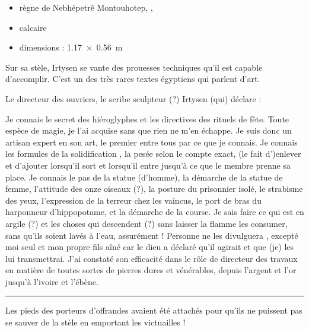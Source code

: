 \documentclass[dvipsnames,a4paper,twoside,10pt,openany,article]{memoir}
\newcommand{\separation}{%
  {\noi\hspace*{\fill}\rule{.33\textwidth}{1pt}\hspace*{\fill}}%
}
\begin{document}
\begin{itemize}
  \item règne de Nebhépetrê Montouhotep, 
        , 
  \item calcaire
  \item dimensions : \SI{1.17x0.56}{\m}
\end{itemize}

Sur sa stèle, Irtysen se vante des prouesses techniques qu'il est 
capable d'accomplir. C'est un des très rares textes égyptiens qui 
parlent d'art.

\begin{encadre}[font=\em, frametitle={Traduction partielle 
                \autocite[doc.~\num{19}]{ChB}}]
  Le directeur des ouvriers, le scribe sculpteur (?) Irtysen (qui) 
  déclare : 

  \og Je connais  le secret des hiéroglyphes et les directives 
  des rituels de fête. Toute espèce de magie, je l'ai acquise sans que 
  rien ne m'en échappe.  Je suis donc un artisan expert en son 
  art, le premier entre tous par ce que je connais. 
  Je connais les formules de la solidification ,  la pesée  selon le compte 
  exact, (le fait d')enlever et d'ajouter  lorsqu'il 
  sort et lorsqu'il entre  jusqu'à ce que le 
  membre  prenne sa place. Je connais 
  le pas de la statue  (d'homme), la démarche de la statue de 
  femme, l'attitude des onze oiseaux (?), la posture du prisonnier 
  isolé, le strabisme des yeux, l'expression de la terreur chez les 
  vaincus,  le port de bras du harponneur d'hippopotame, et 
  la démarche de la course. Je sais faire ce qui est en argile (?) 
  et les choses  qui descendent (?) sans laisser la flamme 
  les consumer, sans qu'ils soient lavés à l'eau, assurément !
   Personne ne les divulguera , excepté 
  moi seul et mon propre fils aîné car le dieu a déclaré qu'il agirait
   et que (je) les lui transmettrai. J'ai constaté son 
  efficacité dans le rôle de directeur des travaux en matière de 
  toutes sortes de pierres dures et vénérables, depuis l'argent et 
  l'or  jusqu'à l'ivoire et l'ébène. \fg
\end{encadre}


\separation

Les pieds des porteurs d'offrandes avaient été attachés pour qu'ils 
ne puissent pas se sauver de la stèle en emportant les victuailles !



\backmatter
\newpage
\listoffigures
\printbibliography

\end{document}
